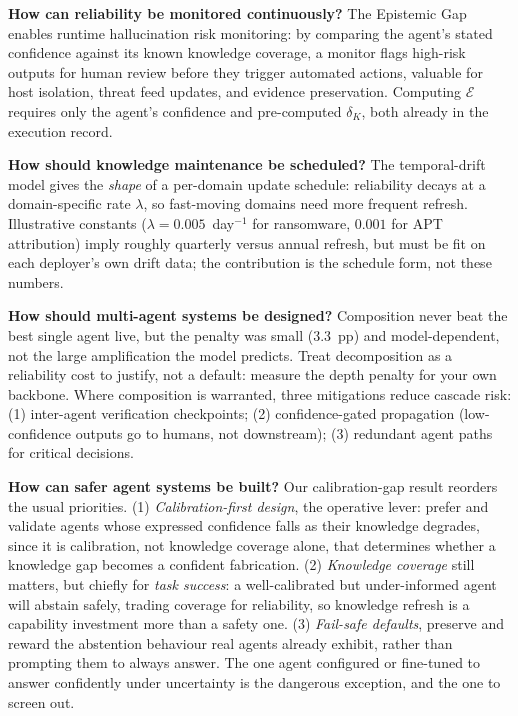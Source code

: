 \documentclass[journal,compsoc]{IEEEtran}
\begin{document}
\textbf{How can reliability be monitored continuously?}
The Epistemic Gap enables runtime hallucination risk monitoring: by
comparing the agent's stated confidence against its known knowledge
coverage, a monitor flags high-risk outputs for human review before
they trigger automated actions, valuable for host isolation, threat
feed updates, and evidence preservation. Computing $\mathcal{E}$
requires only the agent's confidence and pre-computed $\delta_K$,
both already in the execution record.

\textbf{How should knowledge maintenance be scheduled?}
The temporal-drift model gives the \textit{shape} of a per-domain
update schedule: reliability decays at a domain-specific rate
$\lambda$, so fast-moving domains need more frequent refresh.
Illustrative constants ($\lambda = 0.005$~day$^{-1}$ for ransomware,
$0.001$ for APT attribution) imply roughly quarterly versus annual
refresh, but must be fit on each deployer's own drift data; the
contribution is the schedule form, not these numbers.

\textbf{How should multi-agent systems be designed?}
Composition never beat the best single agent live, but the penalty was
small ($3.3$~pp) and model-dependent, not the large amplification the
model predicts. Treat decomposition as a reliability cost to justify,
not a default: measure the depth penalty for your own backbone. Where
composition is warranted, three mitigations reduce cascade risk: (1)
inter-agent verification checkpoints; (2) confidence-gated propagation
(low-confidence outputs go to humans, not downstream); (3) redundant
agent paths for critical decisions.

\textbf{How can safer agent systems be built?}
Our calibration-gap result reorders the usual priorities. (1)
\textit{Calibration-first design}, the operative lever: prefer and
validate agents whose expressed confidence falls as their knowledge
degrades, since it is calibration, not knowledge coverage alone, that
determines whether a knowledge gap becomes a confident fabrication.
(2) \textit{Knowledge coverage} still matters, but chiefly for
\textit{task success}: a well-calibrated but under-informed agent will
abstain safely, trading coverage for reliability, so knowledge refresh
is a capability investment more than a safety one. (3) \textit{Fail-safe
defaults}, preserve and reward the abstention behaviour real agents
already exhibit, rather than prompting them to always answer. The one
agent configured or fine-tuned to answer confidently under uncertainty
is the dangerous exception, and the one to screen out.
\end{document}
